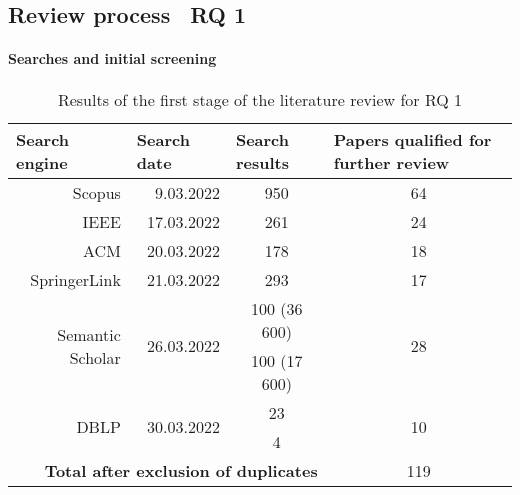 \subsection{Review process \textendas\ RQ 1}\label{subsec:review-process-rq-1}

\paragraph{Searches and initial screening}

\begin{table}[]
    \centering
    \caption{Results of the first stage of the literature review for RQ 1}
    \begin{tabular}{@{}rrcc@{}}
        \toprule
        \multicolumn{1}{l}{\textbf{Search engine}} & \multicolumn{1}{l}{\textbf{Search date}} & \multicolumn{1}{l}{\textbf{Search results}} & \multicolumn{1}{l}{\textbf{Papers qualified for further review}} \\
        \midrule
        Scopus                            & 9.03.2022                   & 950          & 64                      \\
        IEEE                              & 17.03.2022                  & 261          & 24                      \\
        ACM                               & 20.03.2022                  & 178          & 18                      \\
        SpringerLink                      & 21.03.2022                  & 293          & 17                      \\
        \multirow{2}{*}{Semantic Scholar} & \multirow{2}{*}{26.03.2022} & 100 (36 600) & \multirow{2}{*}{28}     \\
                                          &                             & 100 (17 600) &                         \\
        \multirow{2}{*}{DBLP}             & \multirow{2}{*}{30.03.2022} & 23           & \multirow{2}{*}{10}     \\
                                          &                             & 4            &                         \\
        \midrule
        \multicolumn{3}{r}{\textbf{Total after exclusion of duplicates}}               & 119 \\
        \bottomrule
    \end{tabular}
    \label{tab:results-first-stage-review-rq-1}
\end{table}
